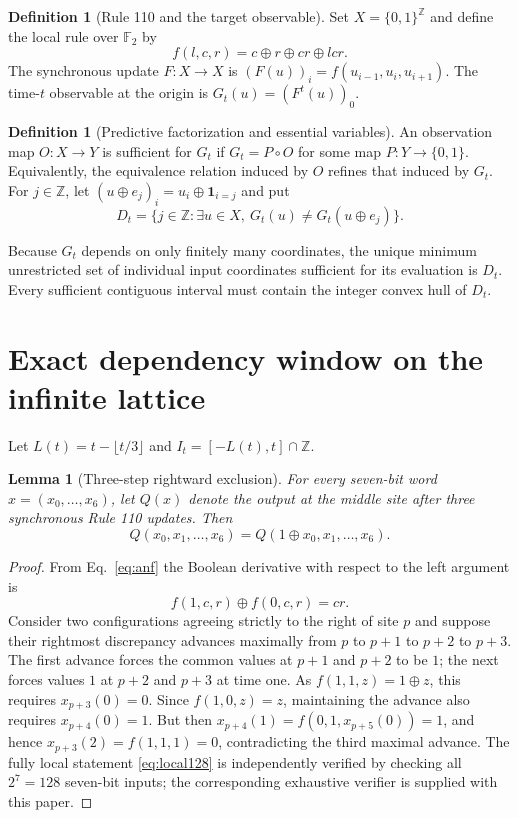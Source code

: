 \documentclass[11pt,a4paper]{article}
\newtheorem{lemma}[theorem]{Lemma}
\theoremstyle{definition}
\newtheorem{definition}[theorem]{Definition}
\theoremstyle{remark}
\newcommand{\Z}{\mathbb{Z}}
\newcommand{\F}{\mathbb{F}_2}
\newcommand{\xor}{\oplus}
\begin{document}
\begin{definition}[Rule 110 and the target observable]
Set $X=\{0,1\}^{\Z}$ and define the local rule over $\F$ by
\begin{equation}\label{eq:anf}
f(l,c,r)=c\xor r\xor cr\xor lcr.
\end{equation}
The synchronous update $F:X\to X$ is $(F(u))_i=f(u_{i-1},u_i,u_{i+1})$. The time-$t$ observable at the origin is $G_t(u)=(F^t(u))_0$.
\end{definition}
\begin{definition}[Predictive factorization and essential variables]
An observation map $O:X\to Y$ is sufficient for $G_t$ if $G_t=P\circ O$ for some map $P:Y\to\{0,1\}$. Equivalently, the equivalence relation induced by $O$ refines that induced by $G_t$. For $j\in\Z$, let $(u\xor e_j)_i=u_i\xor\mathbf1_{i=j}$ and put
\begin{equation}\label{eq:essential}
D_t=\{j\in\Z:\exists u\in X,\ G_t(u)\ne G_t(u\xor e_j)\}.
\end{equation}
\end{definition}
Because $G_t$ depends on only finitely many coordinates, the unique minimum unrestricted set of individual input coordinates sufficient for its evaluation is $D_t$. Every sufficient contiguous interval must contain the integer convex hull of $D_t$.

\section{Exact dependency window on the infinite lattice}
Let $L(t)=t-\lfloor t/3\rfloor$ and $I_t=[-L(t),t]\cap\Z$.

\begin{lemma}[Three-step rightward exclusion]\label{lem:local3}
For every seven-bit word $x=(x_0,\ldots,x_6)$, let $Q(x)$ denote the output at the middle site after three synchronous Rule 110 updates. Then
\begin{equation}\label{eq:local128}
Q(x_0,x_1,\ldots,x_6)=Q(1\xor x_0,x_1,\ldots,x_6).
\end{equation}
\end{lemma}
\begin{proof}
From Eq.~\eqref{eq:anf} the Boolean derivative with respect to the left argument is
\[
 f(1,c,r)\xor f(0,c,r)=cr.
\]
Consider two configurations agreeing strictly to the right of site $p$ and suppose their rightmost discrepancy advances maximally from $p$ to $p+1$ to $p+2$ to $p+3$. The first advance forces the common values at $p+1$ and $p+2$ to be $1$; the next forces values $1$ at $p+2$ and $p+3$ at time one. As $f(1,1,z)=1\xor z$, this requires $x_{p+3}(0)=0$. Since $f(1,0,z)=z$, maintaining the advance also requires $x_{p+4}(0)=1$. But then $x_{p+4}(1)=f(0,1,x_{p+5}(0))=1$, and hence $x_{p+3}(2)=f(1,1,1)=0$, contradicting the third maximal advance. The fully local statement \eqref{eq:local128} is independently verified by checking all $2^7=128$ seven-bit inputs; the corresponding exhaustive verifier is supplied with this paper.
\end{proof}
\end{document}
